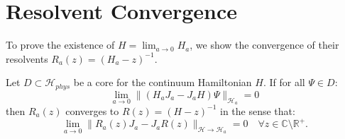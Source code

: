 \section{Resolvent Convergence}
\label{sec:resolvent_proof}

To prove the existence of $H = \lim_{a \to 0} H_a$, we show the convergence of their resolvents $R_a(z) = (H_a - z)^{-1}$.

\begin{theorem}
\label{thm:gnrc}
Let $D \subset \mathcal{H}_{phys}$ be a core for the continuum Hamiltonian $H$. If for all $\Psi \in D$:
\begin{equation} \label{eq:strong_res_conv}
\lim_{a \to 0} \| (H_a J_a - J_a H) \Psi \|_{\mathcal{H}_a} = 0
\end{equation}
then $R_a(z)$ converges to $R(z) = (H-z)^{-1}$ in the sense that:
\begin{equation}
\lim_{a \to 0} \| R_a(z) J_a - J_a R(z) \|_{\mathcal{H} \to \mathcal{H}_a} = 0 \quad \forall z \in \mathbb{C} \setminus \mathbb{R}^+.
\end{equation}
\end{theorem}


